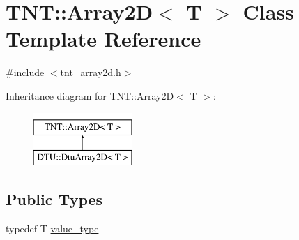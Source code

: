 \hypertarget{classTNT_1_1Array2D}{\section{T\-N\-T\-:\-:Array2\-D$<$ T $>$ Class Template Reference}
\label{classTNT_1_1Array2D}
}


{\ttfamily \#include $<$tnt\-\_\-array2d.\-h$>$}

Inheritance diagram for T\-N\-T\-:\-:Array2\-D$<$ T $>$\-:\begin{figure}[H]
\begin{center}
\leavevmode
\includegraphics[height=2.000000cm]{classTNT_1_1Array2D}
\end{center}
\end{figure}
\subsection*{Public Types}
\begin{DoxyCompactItemize}
\item 
typedef T \hyperlink{classTNT_1_1Array2D_a4b8dd8e113fb40e26d44bc2f7a45cb44}{value\-\_\-type}
\end{DoxyCompactItemize}

